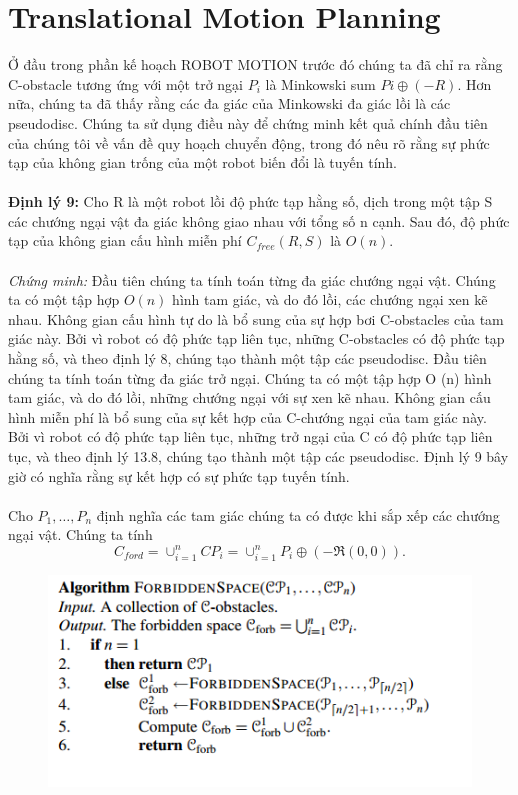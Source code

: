 \documentclass[a4paper,12pt]{report}
\begin{document}
\section{Translational Motion Planning}
Ở đầu trong phần kế hoạch ROBOT MOTION trước đó chúng ta đã chỉ ra rằng C-obstacle tương ứng với một trở ngại $P_i$ là Minkowski sum $Pi \oplus (-R)$. Hơn nữa, chúng ta đã thấy rằng các đa giác của Minkowski đa giác lồi là các pseudodisc. Chúng ta sử dụng điều này để chứng minh kết quả chính đầu tiên của chúng tôi về vấn đề quy hoạch chuyển động, trong đó nêu rõ rằng sự phức tạp của không gian trống của một robot biến đổi là tuyến tính. \\ \\
\textbf{Định lý 9: }Cho R là một robot lồi độ phức tạp hằng số, dịch trong một tập S các chướng ngại vật đa giác không giao nhau với tổng số n cạnh. Sau đó, độ phức tạp của không gian cấu hình miễn phí $C_{free}(R, S)$ là $O(n)$. \\ \\
\textit{Chứng minh: }Đầu tiên chúng ta tính toán từng đa giác chướng ngại vật. Chúng ta có một tập hợp $O (n)$ hình tam giác, và do đó lồi, các chướng ngại xen kẽ nhau. Không gian cấu hình tự do là bổ sung của sự hợp bơi C-obstacles của tam giác này. Bởi vì robot có độ phức tạp liên tục, những C-obstacles có độ phức tạp hằng số, và theo định lý 8, chúng tạo thành một tập các pseudodisc. Đầu tiên chúng ta tính toán từng đa giác trở ngại. Chúng ta có một tập hợp O (n) hình tam giác, và do đó lồi, những chướng ngại với sự xen kẽ nhau. Không gian cấu hình miễn phí là bổ sung của sự kết hợp của C-chướng ngại của tam giác này. Bởi vì robot có độ phức tạp liên tục, những trở ngại của C có độ phức tạp liên tục, và theo định lý 13.8, chúng tạo thành một tập các pseudodisc. Định lý 9 bây giờ có nghĩa rằng sự kết hợp có sự phức tạp tuyến tính. \\ \\
Cho $P_1, \ldots , P_n$ định nghĩa các tam giác chúng ta có được khi sắp xếp các chướng ngại vật. Chúng ta tính
\begin{displaymath}
C_{ford} = \cup_{i = 1}^nCP_i = \cup_{i = 1}^nP_i \oplus(-\Re(0,0)).
\end{displaymath}
\begin{figure}[H]
\includegraphics[width=0.7\linewidth]{ag2.png}
\end{figure}
\end{document}
